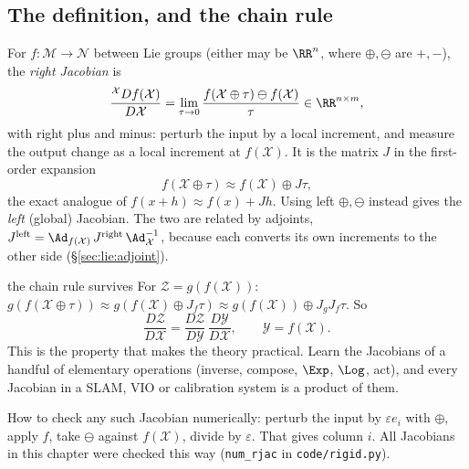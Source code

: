 \subsection{The definition, and the chain rule}\label{sec:lie:jacobian-definition}

For $f:\mathcal M\to\mathcal N$ between Lie groups (either may be $\RR^n$, where $\oplus,\ominus$ are $+,-$), the \emph{right Jacobian} is
\[
\frac{{}^{\mathcal X}Df(\mathcal X)}{D\mathcal X}=\lim_{\tau\to0}\frac{f(\mathcal X\oplus\tau)\ominus f(\mathcal X)}{\tau}\in\RR^{n\times m},
\]
with right plus and minus: perturb the input by a local increment, and measure the output change as a local increment at $f(\mathcal X)$. It is the matrix $J$ in the first-order expansion
\[
f(\mathcal X\oplus\tau)\approx f(\mathcal X)\oplus J\tau,
\]
the exact analogue of $f(x+h)\approx f(x)+J h$. Using left $\oplus,\ominus$ instead gives the \emph{left} (global) Jacobian. The two are related by adjoints, $J^{\text{left}}=\Ad_{f(\mathcal X)}\,J^{\text{right}}\,\Ad_{\mathcal X}^{-1}$, because each converts its own increments to the other side (\S\ref{sec:lie:adjoint}).

\begin{deriv}{the chain rule survives}
For $\mathcal Z=g(f(\mathcal X))$: $g(f(\mathcal X\oplus\tau))\approx g(f(\mathcal X)\oplus J_f\tau)\approx g(f(\mathcal X))\oplus J_gJ_f\tau$. So
\[
\frac{D\mathcal Z}{D\mathcal X}=\frac{D\mathcal Z}{D\mathcal Y}\,\frac{D\mathcal Y}{D\mathcal X},\qquad\mathcal Y=f(\mathcal X).
\]
This is the property that makes the theory practical. Learn the Jacobians of a handful of elementary operations (inverse, compose, $\Exp$, $\Log$, act), and every Jacobian in a SLAM, VIO or calibration system is a product of them.
\end{deriv}

How to check any such Jacobian numerically: perturb the input by $\varepsilon e_i$ with $\oplus$, apply $f$, take $\ominus$ against $f(\mathcal X)$, divide by $\varepsilon$. That gives column $i$. All Jacobians in this chapter were checked this way (\texttt{num\_rjac} in \texttt{code/rigid.py}).
